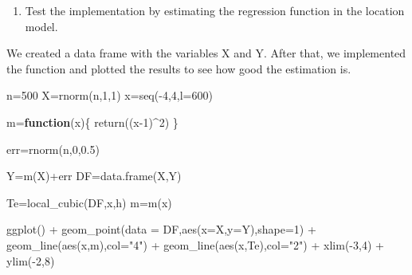 \documentclass[
]{article}
\newenvironment{Shaded}{\begin{snugshade}}{\end{snugshade}}
\newcommand{\AttributeTok}[1]{\textcolor[rgb]{0.77,0.63,0.00}{#1}}
\newcommand{\ControlFlowTok}[1]{\textcolor[rgb]{0.13,0.29,0.53}{\textbf{#1}}}
\newcommand{\DecValTok}[1]{\textcolor[rgb]{0.00,0.00,0.81}{#1}}
\newcommand{\FloatTok}[1]{\textcolor[rgb]{0.00,0.00,0.81}{#1}}
\newcommand{\FunctionTok}[1]{\textcolor[rgb]{0.00,0.00,0.00}{#1}}
\newcommand{\NormalTok}[1]{#1}
\newcommand{\OtherTok}[1]{\textcolor[rgb]{0.56,0.35,0.01}{#1}}
\newcommand{\SpecialCharTok}[1]{\textcolor[rgb]{0.00,0.00,0.00}{#1}}
\newcommand{\StringTok}[1]{\textcolor[rgb]{0.31,0.60,0.02}{#1}}
\providecommand{\tightlist}{%
  \setlength{\itemsep}{0pt}\setlength{\parskip}{0pt}}
\begin{document}
\begin{enumerate}
\def\labelenumi{\alph{enumi}.}
\setcounter{enumi}{1}
\tightlist
\item
  Test the implementation by estimating the regression function in the
  location model.
\end{enumerate}

We created a data frame with the variables X and Y. After that, we
implemented the function and plotted the results to see how good the
estimation is.

\begin{Shaded}
\begin{Highlighting}[]
\NormalTok{n}\OtherTok{=}\DecValTok{500}
\NormalTok{X}\OtherTok{=}\FunctionTok{rnorm}\NormalTok{(n,}\DecValTok{1}\NormalTok{,}\DecValTok{1}\NormalTok{)}
\NormalTok{x}\OtherTok{=}\FunctionTok{seq}\NormalTok{(}\SpecialCharTok{{-}}\DecValTok{4}\NormalTok{,}\DecValTok{4}\NormalTok{,}\AttributeTok{l=}\DecValTok{600}\NormalTok{)}

\NormalTok{m}\OtherTok{=}\ControlFlowTok{function}\NormalTok{(x)\{}
  \FunctionTok{return}\NormalTok{((x}\DecValTok{{-}1}\NormalTok{)}\SpecialCharTok{\^{}}\DecValTok{2}\NormalTok{)}
\NormalTok{\}}

\NormalTok{err}\OtherTok{=}\FunctionTok{rnorm}\NormalTok{(n,}\DecValTok{0}\NormalTok{,}\FloatTok{0.5}\NormalTok{)}

\NormalTok{Y}\OtherTok{=}\FunctionTok{m}\NormalTok{(X)}\SpecialCharTok{+}\NormalTok{err}
\NormalTok{DF}\OtherTok{=}\FunctionTok{data.frame}\NormalTok{(X,Y)}


\NormalTok{Te}\OtherTok{=}\FunctionTok{local\_cubic}\NormalTok{(DF,x,h)}
\NormalTok{m}\OtherTok{=}\FunctionTok{m}\NormalTok{(x)}

\FunctionTok{ggplot}\NormalTok{() }\SpecialCharTok{+} \FunctionTok{geom\_point}\NormalTok{(}\AttributeTok{data =}\NormalTok{ DF,}\FunctionTok{aes}\NormalTok{(}\AttributeTok{x=}\NormalTok{X,}\AttributeTok{y=}\NormalTok{Y),}\AttributeTok{shape=}\DecValTok{1}\NormalTok{) }\SpecialCharTok{+} \FunctionTok{geom\_line}\NormalTok{(}\FunctionTok{aes}\NormalTok{(x,m),}\AttributeTok{col=}\StringTok{"4"}\NormalTok{) }\SpecialCharTok{+} 
  \FunctionTok{geom\_line}\NormalTok{(}\FunctionTok{aes}\NormalTok{(x,Te),}\AttributeTok{col=}\StringTok{"2"}\NormalTok{) }\SpecialCharTok{+} \FunctionTok{xlim}\NormalTok{(}\SpecialCharTok{{-}}\DecValTok{3}\NormalTok{,}\DecValTok{4}\NormalTok{) }\SpecialCharTok{+} \FunctionTok{ylim}\NormalTok{(}\SpecialCharTok{{-}}\DecValTok{2}\NormalTok{,}\DecValTok{8}\NormalTok{)}
\end{Highlighting}
\end{Shaded}
\end{document}
